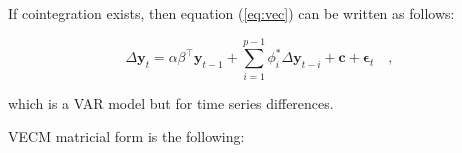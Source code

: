 If cointegration exists, then equation (\ref{eq:vec}) can be written as follows:


\begin{equation}
 \label{eq:vecfull}
 \Delta \mathbf{y}_t = \alpha \beta^\top\mathbf{y}_{t-1} 
 + \sum_{i=1}^{p-1} \phi_i^*\Delta
\mathbf{y}_{t-i}  + \mathbf{c} + \mathbf{\epsilon}_t \quad ,
\end{equation}

\noindent which is a VAR model but for time series differences.

VECM matricial form is the following:

%


